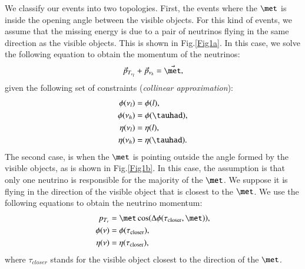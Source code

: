 We classify our events into two topologies. First, the events where the $\met$ is inside the opening angle between the visible objects. For this kind of events, we assume that the missing energy is due to a pair of neutrinos flying in the same direction as the visible objects. This is shown in Fig.\ref{Fig1a}. In this case, we solve the following equation to obtain the momentum of the neutrinos:
\begin{equation}
\vec{p}_{T_{\nu_l}}+\vec{p}_{\nu_h}=\vec{\met},
\end{equation}
given the following set of constraints (\textit{collinear approximation}):
\begin{align}
	\phi(\nu_l)&=\phi(l),
	\\
	\phi(\nu_h)&=\phi(\tauhad),
	\\
	\eta(\nu_l)&=\eta(l),
	\\
	\eta(\nu_h)&=\eta(\tauhad).
\end{align}
The second case, is when the $\met$ is pointing outside the angle formed by the visible objects, as is shown in Fig.\ref{Fig1b}. In this case, the assumption is that only one neutrino is responsible for the majority of the $\met$. We suppose it is flying in the direction of the visible object that is closest to the $\met$. We use the following equations to obtain the neutrino momentum:
\begin{align}
	p_{T_{\nu}}&=\met \cos(\Delta\phi(\tau_{\text{closer}},\met)),
	\\
	\phi(\nu)&=\phi(\tau_{\text{closer}}),
	\\
	\eta(\nu)&=\eta(\tau_{\text{closer}}),
\end{align} 
where $\tau_{closer}$ stands for the visible object closest to the direction of the $\met$.

